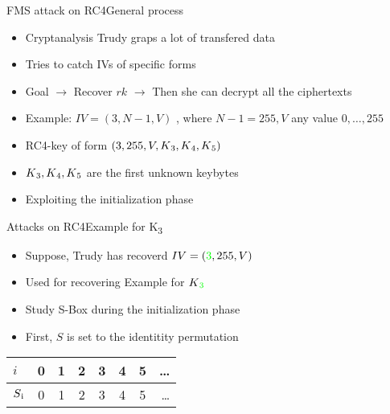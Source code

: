 \documentclass[
	aspectratio=169,	%
	onlytextwidth,		%
	t,					%
	]{beamer}
\begin{document}
\begin{frame}[fragile]{FMS attack on RC4}{General process}
	\begin{itemize}
		\item Cryptanalysis Trudy graps a lot of transfered data
		\item Tries to catch IVs of specific forms 
		\item Goal $\rightarrow$ Recover $rk$ $\rightarrow$ Then she can decrypt all the ciphertexts
		\item Example: $ IV = (3, N-1, V)$ , where $N-1 = 255, V$ any value ${0,\dots,255}$
		\item RC4-key of form $(3, 255, V, K\textsubscript{3}, K\textsubscript{4},K\textsubscript{5})$
		\item $K\textsubscript{3}, K\textsubscript{4},K\textsubscript{5}$ are the first unknown keybytes
		\item Exploiting the initialization phase
	\end{itemize}
\end{frame}

\begin{frame}[fragile]{Attacks on RC4}{Example for K\textsubscript{3}}
	\begin{itemize}
		\item Suppose, Trudy has recoverd $IV = (\textcolor{green}{3}, 255, V)$ 
		\item Used for recovering Example for $K\textsubscript{\textcolor{green}{3}}$
		\item Study S-Box during the initialization phase
		\item First, $S$ is set to the identitity permutation
	\end{itemize}
	\medskip
	\begin{table}[h!]
		\begin{center}
		  \begin{tabular}{l|c|c|c|c|c|c|r}
			$i$ & 0 & 1 & 2 & 3 & 4 & 5 & \dots\\
			\hline
			$S\textsubscript{i}$ & 0 & 1 & 2 & 3 & 4 & 5 & \dots\\
		  \end{tabular}
		\end{center}
	\end{table}
\end{frame}
\end{document}

